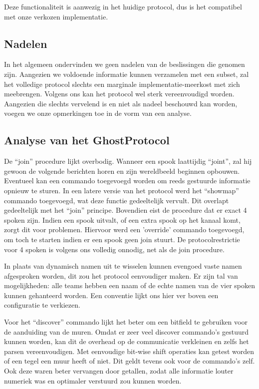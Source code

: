 \documentclass[12pt,a4paper]{report}
\begin{document}
Deze functionaliteit is aanwezig in het huidige protocol, dus is het compatibel met onze verkozen implementatie.

\subsection{Nadelen}

In het algemeen ondervinden we geen nadelen van de beslissingen die genomen zijn. Aangezien we voldoende informatie kunnen verzamelen met een subset, zal het volledige protocol slechts een marginale implementatie-meerkost met zich meebrengen. Volgens ons kan het protocol wel sterk vereenvoudigd worden. Aangezien die slechts vervelend is en niet als nadeel beschouwd kan worden, voegen we onze opmerkingen toe in de vorm van een analyse.

\subsection{Analyse van het GhostProtocol}

De ``join'' procedure lijkt overbodig. Wanneer een spook laattijdig ``joint'', zal hij gewoon de volgende berichten horen en zijn wereldbeeld beginnen opbouwen. Eventueel kan een commando toegevoegd worden om reeds gestuurde informatie opnieuw te sturen. In een latere versie van het protocol werd het ``showmap'' commando toegevoegd, wat deze functie gedeeltelijk vervult. Dit overlapt gedeeltelijk met het ``join'' principe. Bovendien eist de procedure dat er exact 4 spoken zijn. Indien een spook uitvalt, of een extra spook op het kanaal komt, zorgt dit voor problemen. Hiervoor werd een 'override' commando toegevoegd, om toch te starten indien er een spook geen join stuurt. De protocolrestrictie voor 4 spoken is volgens ons volledig onnodig, net als de join procedure. 

In plaats van dynamisch namen uit te wisselen kunnen evengoed vaste namen afgesproken worden, dit zou het protocol eenvoudiger maken. Er zijn tal van mogelijkheden: alle teams hebben een naam of de echte namen van de vier spoken kunnen gehanteerd worden. Een conventie lijkt ons hier ver boven een configuratie te verkiezen.

Voor het ``discover'' commando lijkt het beter om een bitfield te gebruiken voor de aanduiding van de muren. Omdat er zeer veel discover commando's gestuurd kunnen worden, kan dit de overhead op de communicatie verkleinen en zelfs het parsen vereenvoudigen. Met eenvoudige bit-wise shift operaties kan getest worden of een tegel een muur heeft of niet. Dit geldt tevens ook voor de commando's zelf. Ook deze waren beter vervangen door getallen, zodat alle informatie louter numeriek was en optimaler verstuurd zou kunnen worden.
\end{document}
